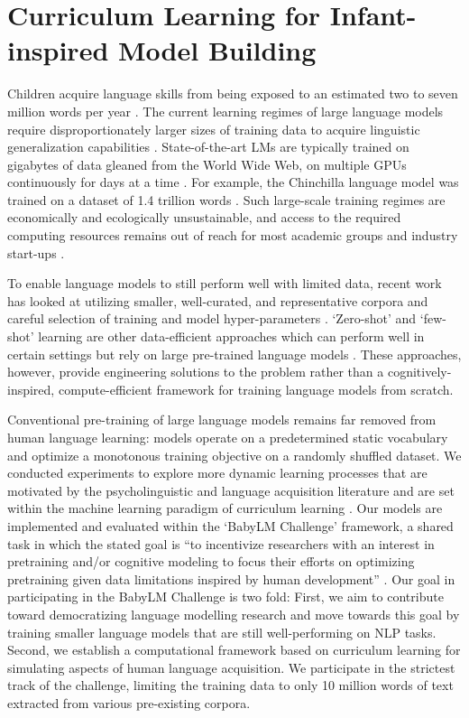 \chapter{Curriculum Learning for Infant-inspired Model Building}
\label{chapter:CLIMB}

Children acquire language skills from being exposed to an estimated two to seven million words per year \citep{gilkerson2017mapping}. The current learning regimes of large language models require disproportionately larger sizes of training data to acquire linguistic generalization capabilities \citep{zhang2021need}. State-of-the-art LMs are typically trained on gigabytes of data gleaned from the World Wide Web, on multiple GPUs continuously for days at a time \cite{zhao2023llmsurvey}. For example, the Chinchilla language model was trained on a dataset of 1.4 trillion words \cite{hoffman2022chinchilla}. Such large-scale training regimes are economically and ecologically unsustainable, and access to the required computing resources remains out of reach for most academic groups and industry start-ups \cite{izsak2021train}.

To enable language models to still perform well with limited data, recent work has looked at utilizing smaller, well-curated, and representative corpora \citep{samuel2023ltgbert, gao2020pile} and careful selection of training and model hyper-parameters \citep{geiping2023cramming}. `Zero-shot' and `few-shot' learning are other data-efficient approaches which can perform well in certain settings but rely on large pre-trained language models \cite{brown2020gpt3,wei2021flan}.
These approaches, however, provide engineering solutions to the problem rather than a cognitively-inspired, compute-efficient framework for training language models from scratch.  

Conventional pre-training of large language models remains far removed from human language learning: models operate on a predetermined static vocabulary and optimize a monotonous training objective on a randomly shuffled dataset. We conducted experiments to explore more dynamic learning processes that are motivated by the psycholinguistic and language acquisition literature and are set within the machine learning paradigm of curriculum learning \cite{bengio2009curriculum}.
Our models are implemented and evaluated within the `BabyLM Challenge' framework, a shared task in which the stated goal is ``to incentivize researchers with an interest in pretraining and/or cognitive modeling to focus their efforts on optimizing pretraining given data limitations inspired by human development'' \cite{warstadt2023findings}. Our goal in participating in the BabyLM Challenge is two fold: First, we aim to contribute toward democratizing language modelling research and move towards this goal by training smaller language models that are still well-performing on NLP tasks. Second, we establish a computational framework based on curriculum learning for simulating aspects of human language acquisition. We participate in the strictest track of the challenge, limiting the training data to only 10 million words of text extracted from various pre-existing corpora. 

